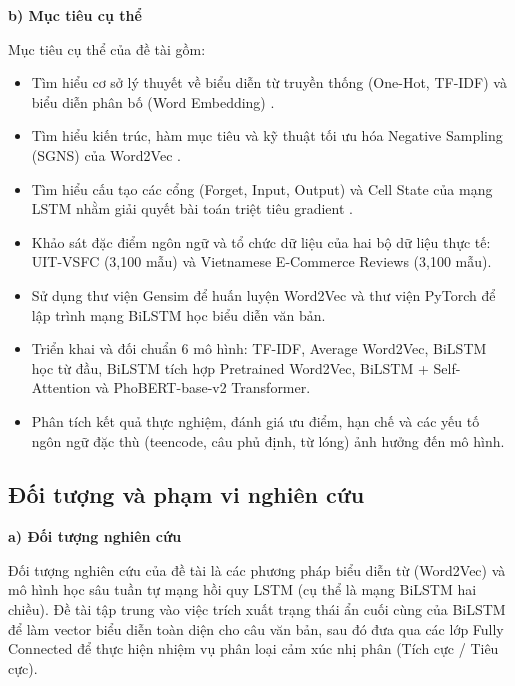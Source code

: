 \documentclass[12pt,a4paper]{article}
\begin{document}
\vspace{0.2cm}\label{sec:muc_tieu_cu_the}\noindent\textbf{b) Mục tiêu cụ thể}\par
Mục tiêu cụ thể của đề tài gồm:
\begin{itemize}[leftmargin=1.0cm, itemsep=2pt]
    \item[--] Tìm hiểu cơ sở lý thuyết về biểu diễn từ truyền thống (One-Hot, TF-IDF) và biểu diễn phân bố (Word Embedding) \cite{goldberg2016primer, jurafsky2026speech}.
    \item[--] Tìm hiểu kiến trúc, hàm mục tiêu và kỹ thuật tối ưu hóa Negative Sampling (SGNS) của Word2Vec \cite{mikolov2013efficient, mikolov2013distributed}.
    \item[--] Tìm hiểu cấu tạo các cổng (Forget, Input, Output) và Cell State của mạng LSTM nhằm giải quyết bài toán triệt tiêu gradient \cite{hochreiter1997lstm, gers2000learning}.
    \item[--] Khảo sát đặc điểm ngôn ngữ và tổ chức dữ liệu của hai bộ dữ liệu thực tế: UIT-VSFC (3,100 mẫu) \cite{nguyen2018uit} và Vietnamese E-Commerce Reviews (3,100 mẫu).
    \item[--] Sử dụng thư viện Gensim \cite{rehurek2010software} để huấn luyện Word2Vec và thư viện PyTorch để lập trình mạng BiLSTM học biểu diễn văn bản.
    \item[--] Triển khai và đối chuẩn 6 mô hình: TF-IDF, Average Word2Vec, BiLSTM học từ đầu, BiLSTM tích hợp Pretrained Word2Vec, BiLSTM + Self-Attention và PhoBERT-base-v2 Transformer.
    \item[--] Phân tích kết quả thực nghiệm, đánh giá ưu điểm, hạn chế và các yếu tố ngôn ngữ đặc thù (teencode, câu phủ định, từ lóng) ảnh hưởng đến mô hình.
\end{itemize}

\subsection{Đối tượng và phạm vi nghiên cứu}\label{sec:doi_tuong_pham_vi}

\vspace{0.2cm}\label{sec:doi_tuong_nghien_cuu}\noindent\textbf{a) Đối tượng nghiên cứu}\par
Đối tượng nghiên cứu của đề tài là các phương pháp biểu diễn từ (Word2Vec) và mô hình học sâu tuần tự mạng hồi quy LSTM (cụ thể là mạng BiLSTM hai chiều). Đề tài tập trung vào việc trích xuất trạng thái ẩn cuối cùng của BiLSTM để làm vector biểu diễn toàn diện cho câu văn bản, sau đó đưa qua các lớp Fully Connected để thực hiện nhiệm vụ phân loại cảm xúc nhị phân (Tích cực / Tiêu cực).
\end{document}
